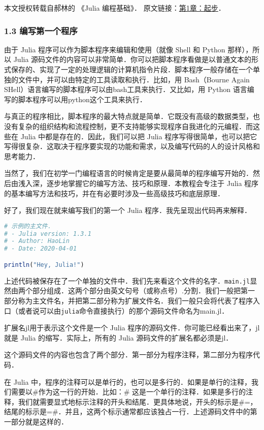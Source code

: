 
本文授权转载自郝林的 《Julia 编程基础》． 原文链接：\href{https://github.com/hyper0x/JuliaBasics/blob/master/book/ch01.md}{第1章：起步}．


\subsubsection{1.3 编写第一个程序}

由于 Julia 程序可以作为脚本程序来编辑和使用（就像 Shell 和 Python 那样），所以 Julia 源码文件的内容可以非常简单．你可以把脚本程序看做是以普通文本的形式保存的、实现了一定的处理逻辑的计算机指令片段．脚本程序一般存储在一个单独的文件中，并可以由特定的工具读取和执行．比如，用 Bash（Bourne Again SHell）语言编写的脚本程序可以由bash工具来执行．又比如，用 Python 语言编写的脚本程序可以用python这个工具来执行．

与真正的程序相比，脚本程序的最大特点就是简单．它既没有高级的数据类型，也没有复杂的组织结构和流程控制，更不支持能够实现程序自我进化的元编程．而这些在 Julia 中都是存在的．因此，我们可以把 Julia 程序写得很简单，也可以把它写得很复杂．这取决于程序要实现的功能和需求，以及编写代码的人的设计风格和思考能力．

当然了，我们在初学一门编程语言的时候肯定是要从最简单的程序编写开始的．然后由浅入深，逐步地掌握它的编写方法、技巧和原理．本教程会专注于 Julia 程序的基本编写方法和技巧，并在有必要时涉及一些高级技巧和底层原理．

好了，我们现在就来编写我们的第一个 Julia 程序．我先呈现出代码再来解释．

\begin{lstlisting}[language=julia]
# 示例的主文件．
# - Julia version: 1.3.1
# - Author: HaoLin
# - Date: 2020-04-01

println("Hey, Julia!")
\end{lstlisting}

上述代码被保存在了一个单独的文件中．我们先来看这个文件的名字．\verb|main.jl|显然由两个部分组成．这两个部分由英文句号（或称点号）.分割．我们一般把第一部分称为主文件名，并把第二部分称为扩展文件名．我们一般只会将代表了程序入口（或者说可以由\verb|julia|命令直接执行）的那个源码文件命名为main.jl．

扩展名jl用于表示这个文件是一个 Julia 程序的源码文件．你可能已经看出来了，jl就是 Julia 的缩写．实际上，所有的 Julia 源码文件的扩展名都必须是jl．

这个源码文件的内容也包含了两个部分．第一部分为程序注释，第二部分为程序代码．

在 Julia 中，程序的注释可以是单行的，也可以是多行的．如果是单行的注释，我们需要以#作为这一行的开始．比如：# 这是一个单行的注释．如果是多行的注释，我们就需要显式地标示注释的开头和结尾．更具体地说，开头的标示是#=，结尾的标示是=#．并且，这两个标示通常都应该独占一行．上述源码文件中的第一部分就是这样的．

